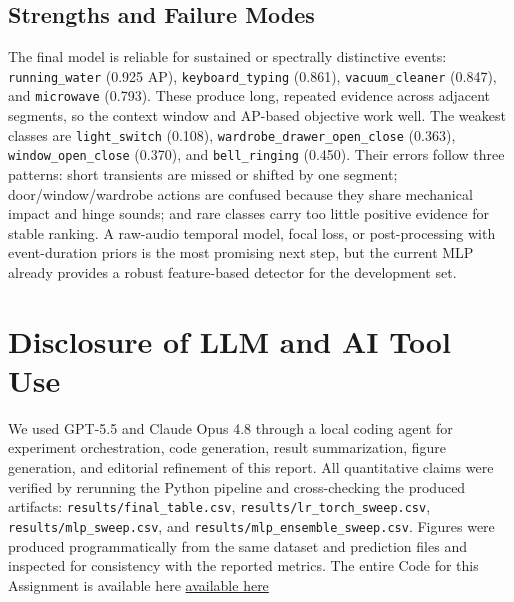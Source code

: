 \documentclass{article}
\begin{document}
\subsection{Strengths and Failure Modes}

The final model is reliable for sustained or spectrally distinctive events: \texttt{running\_water} (0.925 AP), \texttt{keyboard\_typing} (0.861), \texttt{vacuum\_cleaner} (0.847), and \texttt{microwave} (0.793). These produce long, repeated evidence across adjacent segments, so the context window and AP-based objective work well. The weakest classes are \texttt{light\_switch} (0.108), \texttt{wardrobe\_drawer\_open\_close} (0.363), \texttt{window\_open\_close} (0.370), and \texttt{bell\_ringing} (0.450). Their errors follow three patterns: short transients are missed or shifted by one segment; door/window/wardrobe actions are confused because they share mechanical impact and hinge sounds; and rare classes carry too little positive evidence for stable ranking. A raw-audio temporal model, focal loss, or post-processing with event-duration priors is the most promising next step, but the current MLP already provides a robust feature-based detector for the development set.

\section{Disclosure of LLM and AI Tool Use}

We used GPT-5.5 and Claude Opus 4.8 through a local coding agent for experiment orchestration, code generation, result summarization, figure generation, and editorial refinement of this report. All quantitative claims were verified by rerunning the Python pipeline and cross-checking the produced artifacts: \texttt{results/final\_table.csv}, \texttt{results/lr\_torch\_sweep.csv}, \texttt{results/mlp\_sweep.csv}, and \texttt{results/mlp\_ensemble\_sweep.csv}. Figures were produced programmatically from the same dataset and prediction files and inspected for consistency with the reported metrics. The entire Code for this Assignment is available here \href{https://github.com/Julian-AT/mlpc_task_4}{available here}
\end{document}

